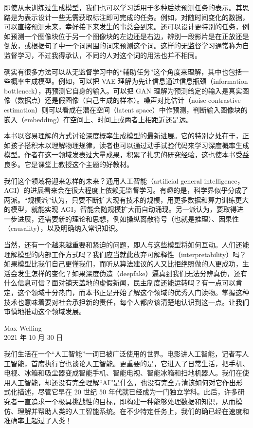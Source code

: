 即使从未训练过生成模型，我们也可以学习适用于多种后续预测任务的表示。其思路是为表示设计一些无需获取标注即可完成的任务。例如，对随时间变化的数据，可以直接预测未来，幸好接下来发生的事总会到来。还可以设计更特别的任务，例如预测一个图像块位于另一个图像块的左边还是右边，辨别一段影片是在正放还是倒放，或根据句子中一个词周围的词来预测这个词。这样的无监督学习通常称为自监督学习，不过我得承认，不同的人对这个词的用法也并不相同。

确实有很多方法可以从无监督学习中的“辅助任务”这个角度来理解，其中也包括一些概率生成模型。例如，可以把 VAE 理解为先让信息通过信息瓶颈（information bottleneck），再预测它自身的输入。可以把 GAN 理解为预测给定的输入是真实图像（数据点）还是假图像（自己生成的样本）。噪声对比估计（noise-contrastive estimation）则可以看成在潜在空间（latent space）中作预测，判断输入图像块的嵌入（embedding）在空间上、时间上或两者上相距近还是远。

本书以容易理解的方式讨论深度概率生成模型的最新进展。它的特别之处在于，正如孩子搭积木以理解物理规律，读者也可以通过动手试验代码来学习深度概率生成模型。作者在这一领域发表过大量成果，积累了扎实的研究经验，这也使本书受益良多。它是课堂上教授这个主题的好教材。

我们这个领域将迎来怎样的未来？通用人工智能（artificial general intelligence，AGI）的进展看来会在很大程度上依赖无监督学习。有趣的是，科学界似乎分成了两派。“规模派”认为，只要不断扩大现有技术的规模，用更多数据和算力训练更大的模型，就能实现 AGI，智能会随规模扩大而自动涌现。另一派认为，要取得进一步进展，还需要新的理论和思想，例如操纵离散符号（也就是推理）、因果性（causality），以及明确纳入常识知识。

当然，还有一个越来越重要和紧迫的问题，即人与这些模型将如何互动。人们还能理解模型的内部工作方式吗？我们应当就此放弃可解释性（interpretability）吗？如果模型比我们自己更懂我们，而听从算法建议的人又比拒绝照做的人更成功，生活会发生怎样的变化？如果深度伪造（deepfake）逼真到我们无法分辨真伪，还有什么信息可信？面对铺天盖地的虚假新闻，民主制度还能运转吗？有一点可以肯定，这个领域十分热门，而本书正是开始了解这个领域的优秀入门读物。掌握这种技术也意味着要对社会承担新的责任，每个人都应该清楚地认识到这一点。让我们审慎地推动这个领域发展。
\begin{flushright}
Max Welling\\
2021 年 10 月 30 日
\end{flushright}

我们生活在一个“人工智能”一词已被广泛使用的世界。电影讲人工智能，记者写人工智能，首席执行官也谈论人工智能。更重要的是，它进入了日常生活，把手机、电视、冰箱和吸尘器变成智能手机、智能电视、智能冰箱和扫地机器人。我们在使用人工智能，却还没有完全理解“AI”是什么，也没有完全弄清该如何对它作出形式化描述，尽管它早在 20 世纪 50 年代就已经成为一门独立学科。此后，许多研究者一直追求一个极具挑战性的目标，即构建一种能够处理数据和知识，从而模仿、理解并帮助人类的人工智能系统。在不少特定任务上，我们的确已经在速度和准确率上超过了人类！

